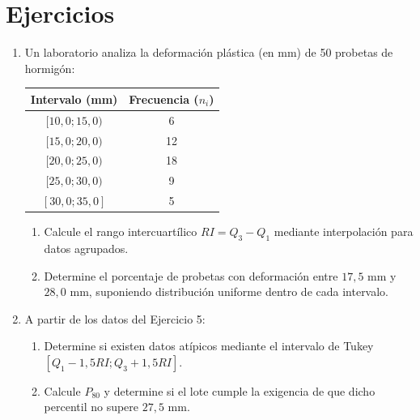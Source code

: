 \documentclass[letterpaper,12pt]{article}
\newenvironment{ejercicios}{%
    \section*{Ejercicios}
}{}
\begin{document}
\begin{ejercicios}
\begin{enumerate}[resume,leftmargin=*,itemsep=0.9em]
    \item Un laboratorio analiza la deformación plástica (en mm) de 50 probetas de hormigón:
    \begin{center}
    \begin{tabular}{cc}
        \toprule
        \textbf{Intervalo (mm)} & \textbf{Frecuencia ($n_i$)} \\
        \midrule
        $[10{,}0;15{,}0)$ & 6 \\
        $[15{,}0;20{,}0)$ & 12 \\
        $[20{,}0;25{,}0)$ & 18 \\
        $[25{,}0;30{,}0)$ & 9 \\
        $[30{,}0;35{,}0]$ & 5 \\
        \bottomrule
    \end{tabular}
    \end{center}
    \begin{enumerate}[label=\alph*)]
        \item Calcule el rango intercuartílico $RI=Q_3-Q_1$ mediante interpolación para datos agrupados.
        \item Determine el porcentaje de probetas con deformación entre $17{,}5$ mm y $28{,}0$ mm, suponiendo distribución uniforme dentro de cada intervalo.
    \end{enumerate}

    \item A partir de los datos del Ejercicio 5:
    \begin{enumerate}[label=\alph*)]
        \item Determine si existen datos atípicos mediante el intervalo de Tukey $[Q_1-1{,}5RI;Q_3+1{,}5RI]$.
        \item Calcule $P_{80}$ y determine si el lote cumple la exigencia de que dicho percentil no supere $27{,}5$ mm.
    \end{enumerate}


\end{enumerate}
\end{ejercicios}
\end{document}
